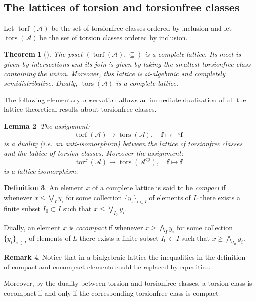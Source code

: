 \documentclass[11pt]{amsart}
\newtheorem{theorem}{Theorem}[section]
\newtheorem{lemma}[theorem]{Lemma}
\theoremstyle{definition}
\newtheorem{definition}[theorem]{Definition}
\newtheorem{remark}[theorem]{Remark}
\newcommand{\A}{\mathcal A}
\newcommand{\tors}{\operatorname{tors}}
\newcommand{\torf}{\operatorname{torf}}
\begin{document}
\subsection{The lattices of torsion and torsionfree classes}

Let \(\torf(\A)\) be the set of torsionfree classes ordered by inclusion and let \(\tors(\A)\) be the set of torsion classes ordered by inclusion.

\begin{theorem}[{\cite[Theorem 3.1]{DIRRT}}]\label{thm:torsionfree-lattice}
The poset \((\torf(\A),\subseteq)\) is a complete lattice. Its meet is given by intersections and its join is given by taking the smallest torsionfree class containing the union. Moreover, this lattice is bi-algebraic and completely semidistributive. Dually, \(\tors(\A)\) is a complete lattice.
\end{theorem}

The following elementary observation allows an immediate dualization of all the lattice theoretical results about torsionfree classes.

\begin{lemma}
The assignment:
\[
	\torf(\A) \to \tors(\A), \quad \mathbf{f} \mapsto {}^{\perp_0}\mathbf{f}
\]
is a duality (i.e. an anti-isomorphism) between the lattice of torsionfree classes and the lattice of torsion classes. 
Moreover the assignment:
\[
	\torf(\A) \to \tors(\A^{\mathrm{op}}), \quad \mathbf{f} \mapsto \mathbf{f}
\]
is a lattice isomorphism.
\end{lemma}

\begin{definition}
An element \( x \) of a complete lattice is said to be \emph{compact} if whenever \( x \le \bigvee_I y_i \) for some collection \( \{ y_i \}_{i \in I} \) of elements of \( L \) there exists a finite subset \( I_0 \subset I \) such that \( x \le \bigvee_{I_0} y_i \). 

Dually, an element \( x \) is \emph{cocompact} if whenever \( x \ge \bigwedge_I y_i \)  for some collection \( \{ y_i \}_{i \in I} \) of elements of \( L \) there exists a finite subset \( I_0 \subset I \) such that \( x \ge \bigwedge_{I_0} y_i \). 
\end{definition}

\begin{remark}
Notice that in a bialgebraic lattice the inequalities in the definition of compact and cocompact elements could be replaced by equalities.

Moreover, by the duality between torsion and torsionfree classes, a torsion class is cocompact if and only if the corresponding torsionfree class is compact. 
\end{remark}
\end{document}
